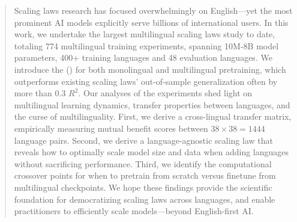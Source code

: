 \begin{abstract}

Scaling laws research has focused overwhelmingly on English---yet the most prominent AI models explicitly serve billions of international users. 
In this work, we undertake the largest multilingual scaling laws study to date, totaling 774 multilingual training experiments, spanning 10M-8B model parameters, 400+ training languages and 48 evaluation languages. 
We introduce the \ourscl{} (\oursclabb) for both monolingual and multilingual pretraining, which outperforms existing scaling laws' out-of-sample generalization often by more than $0.3$ $R^2$.
Our analyses of the experiments shed light on multilingual learning dynamics, transfer properties between languages, and the curse of multilinguality.  
First, we derive a cross-lingual transfer matrix, empirically measuring mutual benefit scores between $38 \times 38=1444$ language pairs.
Second, we derive a language-agnostic scaling law that reveals how to optimally scale model size and data when adding languages without sacrificing performance.
Third, we identify the computational crossover points for when to pretrain from scratch versus finetune from multilingual checkpoints.
We hope these findings provide the scientific foundation for democratizing scaling laws across languages, and enable practitioners to efficiently scale models---beyond English-first AI.

\end{abstract}


